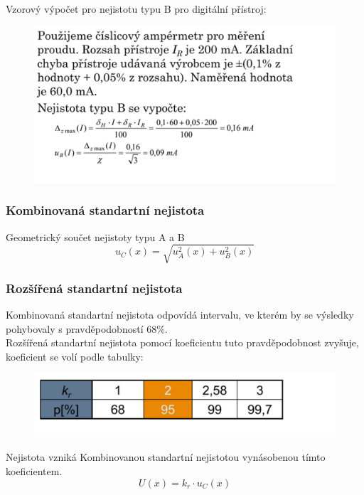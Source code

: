 Vzorový výpočet pro nejistotu typu B pro digitální přístroj:
\begin{figure}[H]
    \centering
    \includegraphics[scale = 1]{images/nejistotaB_digital.png}
\end{figure}

\subsubsection*{Kombinovaná standartní nejistota}
Geometrický součet nejistoty typu A a B
\begin{equation}
    u_C(x) = \sqrt{u_A^2(x)+u_B^2(x)}
\end{equation}
\newpage

\subsubsection*{Rozšířená standartní nejistota}
Kombinovaná standartní nejistota odpovídá intervalu, ve kterém by se výsledky pohybovaly s pravděpodobností 68\%.\\
Rozšířená standartní nejistota pomocí koeficientu tuto pravděpodobnost zvyšuje, koeficient se volí podle tabulky:
\begin{figure}[H]
    \centering
    \includegraphics[scale = 1]{images/nejistota_roz.png}
\end{figure}
Nejistota vzniká Kombinovanou standartní nejistotou vynásobenou tímto koeficientem.
\begin{equation}
    U(x) = k_r\cdot u_C(x)
\end{equation}

